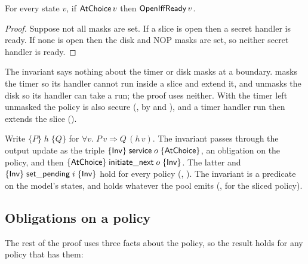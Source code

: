 \begin{lemma}\label{lem:ready}
For every state $v$, if $\mathsf{AtChoice}\,v$ then $\mathsf{OpenIffReady}\,v$.
\end{lemma}

\begin{proof}
Suppose not all masks are set. If a slice is open then a secret handler is ready.
If none is open then the disk and NOP masks are set, so neither secret
handler is ready.
\end{proof}

The invariant says nothing about the timer or disk masks at a boundary.
 masks the timer so its handler cannot run inside a slice and
extend it, and unmasks the disk so its handler can take a run; the proof uses neither. With
the timer left unmasked the policy is also secure (, by
 and ), and a
timer handler run then extends the slice ().

Write $\{P\}\;h\;\{Q\}$ for $\forall v.\; P\,v \Rightarrow Q\,(h\,v)$. The invariant
passes through the output update as the triple
$\{\mathsf{Inv}\}\;\mathsf{service}\;o\;\{\mathsf{AtChoice}\}$, an obligation on the policy, and then
$\{\mathsf{AtChoice}\}\;\mathsf{initiate\_next}\;o\;\{\mathsf{Inv}\}$. The latter and
$\{\mathsf{Inv}\}\;\mathsf{set\_pending}\;i\;\{\mathsf{Inv}\}$ hold for every policy
(, ). The invariant is a predicate on the
model's states, and holds whatever the pool emits (, for the sliced
policy).

\subsection{Obligations on a policy}\label{sec:obligations}

The rest of the proof uses three facts about the policy, so the result holds for any
policy that has them:

